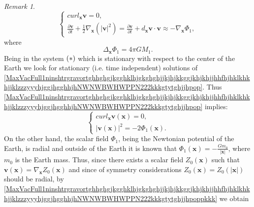 \documentclass{article}
\theoremstyle{definition}
\theoremstyle{remark}
\newtheorem{remark}{Remark}[section]
\renewcommand{\vec}[1]{\mathbf{#1}}
\newcommand{\er}{\eqref}
\newcommand{\er}{\eqref}
\newtheorem{remark}{Remark}
\begin{document}
\begin{remark}
\begin{equation}
\begin{cases}
curl_{\vec x}\vec v=0,\\
\frac{\partial\vec v}{\partial t}+\frac{1}{2}\nabla_{\vec
x}\left(|\vec v|^2\right)=\frac{\partial\vec v}{\partial t}+d_{\vec
x}\vec v\cdot\vec v\approx -\nabla_{\vec x}\Phi_1,
\end{cases}
\end{equation}
where
\begin{equation}
\label{MaxVacFull1ninshtrgravortghhghgjkgghklhjgkghghjjkjhjkkggjkhjkhjjhhfhjhklkhkhjjklzzzyyyhjggjhgghhjhNWNWNWBWHWPPN222kkkiklklk}
\Delta_{\vec x}\Phi_1=4\pi GM_1.
\end{equation}
Being in the system  $\bf(*)$ which is stationary with respect to
the center of the Earth we look for stationary (i.e. time
independent) solutions of
\er{MaxVacFull1ninshtrgravortghhghgjkgghklhjgkghghjjkjhjkkggjkhjkhjjhhfhjhklkhkhjjklzzzyyyhjggjhgghhjhNWNWBWHWPPN222kkkgtytghjjhpop}.
Thus
\er{MaxVacFull1ninshtrgravortghhghgjkgghklhjgkghghjjkjhjkkggjkhjkhjjhhfhjhklkhkhjjklzzzyyyhjggjhgghhjhNWNWBWHWPPN222kkkgtytghjjhpop}
implies:
\begin{equation}
\label{MaxVacFull1ninshtrgravortghhghgjkgghklhjgkghghjjkjhjkkggjkhjkhjjhhfhjhklkhkhjjklzzzyyyhjggjhgghhjhNWNWBWHWPPN222kkkgtytghjjhpoppkkk}
\begin{cases}
curl_{\vec x}\vec v(\vec x)=0,\\
\left|\vec v(\vec x)\right|^2= -2\Phi_1(\vec x).
\end{cases}
\end{equation}
On the other hand, the scalar field $\Phi_1$, being the Newtonian
potential of the Earth, is radial and outside of the Earth it is
known that $\Phi_1(\vec x)=-\frac{Gm_0}{|\vec x|}$, where $m_0$ is
the Earth mass. Thus, since there exists a scalar field $Z_0(\vec
x)$ such that $\vec v(\vec x)=\nabla_{\vec x}Z_0(\vec x)$ and since
of symmetry considerations $Z_0(\vec x)=Z_0(|\vec x|)$ should be
radial, by
\er{MaxVacFull1ninshtrgravortghhghgjkgghklhjgkghghjjkjhjkkggjkhjkhjjhhfhjhklkhkhjjklzzzyyyhjggjhgghhjhNWNWBWHWPPN222kkkgtytghjjhpoppkkk}
we obtain
\begin{equation}
\label{MaxVacFull1ninshtrgravortghhghgjkgghklhjgkghghjjkjhjkkggjkhjkhjjhhfhjhklkhkhjjklzzzyyyhjggjhgghhjhNWNWBWHWPPN222kkkgtytghjjhpoppkkkhhhk}

\end{equation}
\end{remark}
\end{document}

